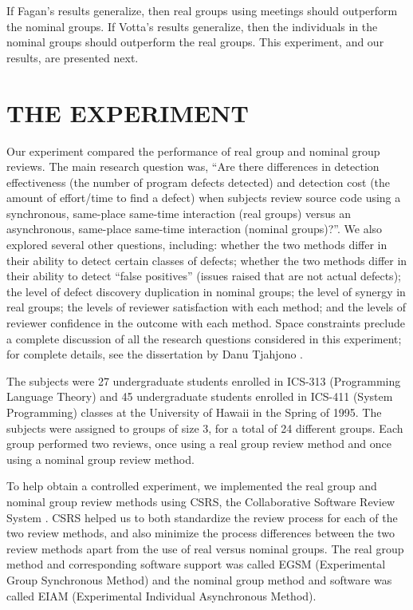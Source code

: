 If Fagan's results generalize, then real groups using meetings should
outperform the nominal groups.  If Votta's results generalize, then the
individuals in the nominal groups should outperform the real groups.  This
experiment, and our results, are presented next.

\section{THE EXPERIMENT}

Our experiment compared the performance of real group and nominal group
reviews.  The main research question was, ``Are there differences in
detection effectiveness (the number of program defects detected) and
detection cost (the amount of effort/time to find a defect) when subjects
review source code using a synchronous, same-place same-time interaction
(real groups) versus an asynchronous, same-place same-time interaction
(nominal groups)?''.  We also explored several other questions, including:
whether the two methods differ in their ability to detect certain classes
of defects; whether the two methods differ in their ability to detect
``false positives'' (issues raised that are not actual defects); the level
of defect discovery duplication in nominal groups; the level of synergy in
real groups; the levels of reviewer satisfaction with each method; and the
levels of reviewer confidence in the outcome with each method.  Space 
constraints preclude a complete discussion of all the research questions
considered in this experiment; for complete details, see the dissertation 
by Danu Tjahjono \cite{csdl-95-08}. 

The subjects were 27 undergraduate students enrolled in ICS-313
(Programming Language Theory) and 45 undergraduate students enrolled in
ICS-411 (System Programming) classes at the University of Hawaii in the
Spring of 1995. The subjects were assigned to groups of size 3, for a total
of 24 different groups.  Each group performed two reviews, once using a
real group review method and once using a nominal group review method.

To help obtain a controlled experiment, we implemented the real group and
nominal group review methods using CSRS, the Collaborative Software Review
System \cite{Johnson94}.  CSRS helped us to both standardize the review
process for each of the two review methods, and also minimize the process
differences between the two review methods apart from the use of real
versus nominal groups. The real group method and corresponding software
support was called EGSM (Experimental Group Synchronous Method) and the
nominal group method and software was called EIAM (Experimental Individual
Asynchronous Method).  


